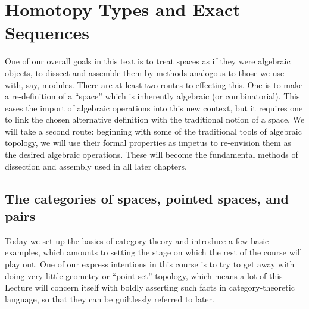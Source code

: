 
\chapter{Homotopy Types and Exact Sequences}

One of our overall goals in this text is to treat spaces as if they were algebraic objects, to dissect and assemble them by methods analogous to those we use with, say, modules.
There are at least two routes to effecting this.
One is to make a re-definition of a ``space'' which is inherently algebraic (or combinatorial).
This eases the import of algebraic operations into this new context, but it requires one to link the chosen alternative definition with the traditional notion of a space.
We will take a second route: beginning with some of the traditional tools of algebraic topology, we will use their formal properties as impetus to re-envision them as the desired algebraic operations.
These will become the fundamental methods of dissection and assembly used in all later chapters.




\section{The categories of spaces, pointed spaces, and pairs}

Today we set up the basics of category theory and introduce a few basic examples, which amounts to setting the stage on which the rest of the course will play out.
One of our express intentions in this course is to try to get away with doing very little geometry or ``point-set'' topology, which means a lot of this Lecture will concern itself with boldly asserting such facts in category-theoretic language, so that they can be guiltlessly referred to later.

